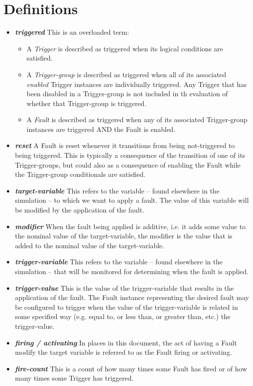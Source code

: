 \documentclass[11pt,fleqn]{report}
\begin{document}
\section{Definitions}
\begin{itemize}
  \item \textit{\textbf{triggered}} This is an overloaded term:
  \begin{itemize}
    \item A \textit{Trigger} is described as triggered when its logical
      conditions are satisfied.
    \item A \textit{Trigger-group} is described as triggered when all of its
      associated \textit{enabled} Trigger instances are individually triggered.
      Any Trigger that has been disabled in a Trigger-group is not included
      in th evaluation of whether that Trigger-group is triggered.
    \item A \textit{Fault} is described as triggered when any of its associated
      Trigger-group instances are triggered AND the Fault is enabled.
    \end{itemize}

  \item \textit{\textbf{reset}} A Fault is reset whenever it transitions from
    being not-triggered to being triggered. This is typically a consequence of
    the transition of one of its Trigger-groups, but could also as a consequence
    of enabling the Fault while the Trigger-group conditionals are satisfied.
  \item \textit{\textbf{target-variable}} This refers to the variable -- found
    elsewhere in the simulation -- to which we want to apply a fault. The value
    of this variable will be modified by the application of the fault.
  \item \textit{\textbf{modifier}} When the fault being applied is additive,
    i.e. it adds some value to the nominal value of the target-variable, the
    modifier is the value that is added to the nominal value of the
    target-variable.
  \item \textit{\textbf{trigger-variable}} This refers to the variable -- found
    elsewhere in the simulation -- that will be monitored for determining when
    the fault is applied.
  \item \textit{\textbf{trigger-value}} This is the value of the
    trigger-variable that results in the application of the fault.
    The Fault instance representing the desired fault may be
    configured to trigger when the value of the trigger-variable is related in
    some specified way (e.g. equal to, or less than, or greater than, etc.) the
    trigger-value.
  \item \textit{\textbf{firing / activating}} In places in this document, the
    act of having a Fault modify the target variable is referred to as the
    Fault firing or activating.
  \item \textit{\textbf{fire-count}} This is a count of how many times some
    Fault has fired or of how many times some Trigger has triggered.
\end{itemize}
\end{document}
